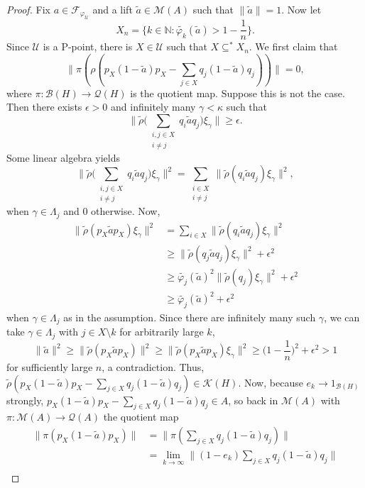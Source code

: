 \documentclass[10pt]{amsart}
\theoremstyle{definition}
\newcommand{\U}{\mathscr{U}}
\begin{document}
\begin{proof}
    Fix $a\in\mathscr{F}_{\varphi_\U}$ and a lift $\tilde{a}\in\mathscr{M}(A)$ such that $\|\tilde{a}\|=1$. Now let 
    \[X_n=\big\{k\in\mathbb{N}:\tilde{\varphi_k}(\tilde{a})>1-\frac{1}{n}\big\}.\]
    Since $\mathscr{U}$ is a P-point, there is $X\in\mathscr{U}$ such that $X\subseteq^* X_n$. We first claim that
    \[\|\pi(\rho(p_{X}(1-\tilde{a})p_{X}-\sum_{j\in {X}}q_j(1-\tilde{a})q_j))\|=0,\]
    where $\pi:\mathscr{B}(H)\rightarrow\mathscr{Q}(H)$ is the quotient map. Suppose this is not the case. Then there exists $\epsilon>0$ and infinitely many $\gamma<\kappa$ such that
    \[\|\tilde{\rho}\big(\sum_{\substack{i,j\in X \\ i\neq j}}q_i\tilde{a}q_j\big)\xi_\gamma\|\geq\epsilon.\]
    Some linear algebra yields
    \[\|\tilde{\rho}\big(\sum_{\substack{i,j\in X \\ i\neq j}}q_i\tilde{a}q_j\big)\xi_\gamma\|^2=\sum_{\substack{i\in X \\ i\neq j}}\|\tilde{\rho}(q_i\tilde{a}q_j)\xi_\gamma\|^2,\]
    when $\gamma\in \Lambda_j$ and $0$ otherwise. Now,
    \begin{align*}
    \|\tilde{\rho}(p_{X}\tilde{a}p_{X})\xi_\gamma\|^2 &=\sum_{i\in X}\|\tilde{\rho}(q_i\tilde{a}q_j)\xi_\gamma\|^2 \\
    &\geq \|\tilde{\rho}(q_j\tilde{a}q_j)\xi_\gamma\|^2+\epsilon^2 \\
    &\geq \tilde{\varphi_j}(\tilde{a})^2\|\tilde{\rho}(q_j)\xi_\gamma\|^2+\epsilon^2 \\
    &\geq \tilde{\varphi_j}(\tilde{a})^2+\epsilon^2
    \end{align*}
    when $\gamma\in\Lambda_j$ as in the assumption. Since there are infinitely many such $\gamma$, we can take $\gamma\in \Lambda_j$ with $j\in X\setminus k$ for arbitrarily large $k$, \[\|\tilde{a}\|^2\geq\|\tilde{\rho}(p_{X}\tilde{a}p_{X})\|^2\geq\|\tilde{\rho}(p_{X}\tilde{a}p_{X})\xi_\gamma\|^2\geq \big(1-\frac{1}{n}\big)^2+\epsilon^2>1\]
    for sufficiently large $n$, a contradiction. Thus, $\tilde{\rho}(p_X(1-\tilde{a})p_X-\sum_{j\in X}q_j(1-\tilde{a})q_j)\in \mathscr{K}(H)$. Now, because $e_k\rightarrow 1_{\mathscr{B}(H)}$ strongly, $p_X(1-\tilde{a})p_X-\sum_{j\in X}q_j(1-\tilde{a})q_j\in A$, so back in $\mathscr{M}(A)$ with $\pi:\mathscr{M}(A)\rightarrow\mathscr{Q}(A)$ the quotient map
    \begin{align*}
        \|\pi(p_X(1-\tilde{a})p_X)\| &= \|\pi(\sum_{j\in X}q_j(1-\tilde{a})q_j)\| \\
        &= \lim_{k\rightarrow\infty}\|(1-e_k)\sum_{j\in X}q_j(1-\tilde{a})q_j\| \\

\end{align*}
\end{proof}
\end{document}

